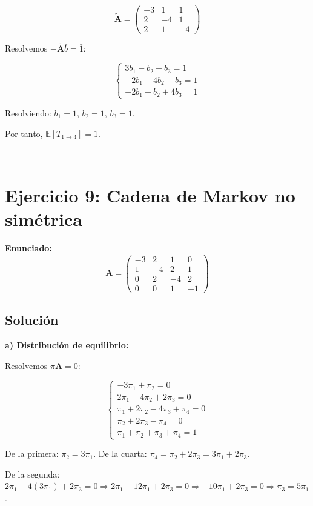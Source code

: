 \documentclass{article}
\theoremstyle{definition}
\newcommand{\E}{\mathbb{E}}
\newcommand{\A}{\mathbf{A}}
\begin{document}
\[
\tilde{\A} = \begin{pmatrix}
    -3 & 1 & 1 \\
    2 & -4 & 1 \\
    2 & 1 & -4
\end{pmatrix}
\]

Resolvemos $-\tilde{\A}\bar{b} = \bar{1}$:

\[
\begin{cases}
    3b_1 - b_2 - b_3 = 1 \\
    -2b_1 + 4b_2 - b_3 = 1 \\
    -2b_1 - b_2 + 4b_3 = 1
\end{cases}
\]

Resolviendo: $b_1 = 1$, $b_2 = 1$, $b_3 = 1$.

Por tanto, $\E[T_{1\to4}] = 1$.

---

\section*{Ejercicio 9: Cadena de Markov no simétrica}

\textbf{Enunciado:} 
\[
\A = \begin{pmatrix}
    -3 & 2 & 1 & 0 \\
    1 & -4 & 2 & 1 \\
    0 & 2 & -4 & 2 \\
    0 & 0 & 1 & -1
\end{pmatrix}
\]

\subsection*{Solución}

\textbf{a) Distribución de equilibrio:}

Resolvemos $\pi\A = 0$:

\[
\begin{cases}
    -3\pi_1 + \pi_2 = 0 \\
    2\pi_1 - 4\pi_2 + 2\pi_3 = 0 \\
    \pi_1 + 2\pi_2 - 4\pi_3 + \pi_4 = 0 \\
    \pi_2 + 2\pi_3 - \pi_4 = 0 \\
    \pi_1 + \pi_2 + \pi_3 + \pi_4 = 1
\end{cases}
\]

De la primera: $\pi_2 = 3\pi_1$.  
De la cuarta: $\pi_4 = \pi_2 + 2\pi_3 = 3\pi_1 + 2\pi_3$.

De la segunda: $2\pi_1 - 4(3\pi_1) + 2\pi_3 = 0 \Rightarrow 2\pi_1 - 12\pi_1 + 2\pi_3 = 0 \Rightarrow -10\pi_1 + 2\pi_3 = 0 \Rightarrow \pi_3 = 5\pi_1$.
\end{document}
